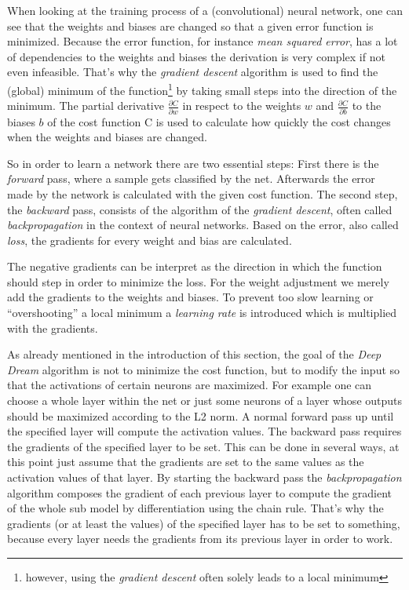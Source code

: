 When looking at the training process of a (convolutional) neural network, one can see that the weights and biases are changed so that a given error function is minimized.
Because the error function, for instance \emph{mean squared error}, has a lot of dependencies to the weights and biases the derivation is very complex if not even infeasible.
That's why the \emph{gradient descent} algorithm is used to find the (global) minimum of the function\footnote{however, using the \textit{gradient descent} often solely leads to a local minimum} by taking small steps into the direction of the minimum.
The partial derivative $\frac{\partial C}{\partial w}$ in respect to the weights $w$ and $\frac{\partial C}{\partial b}$ to the biases $b$ of the cost function C is used to calculate how quickly the cost changes when the weights and biases are changed.

So in order to learn a network there are two essential steps:
First there is the \emph{forward} pass, where a sample gets classified by the net.
Afterwards the error made by the network is calculated with the given cost function.
The second step, the \emph{backward} pass, consists of the algorithm of the \emph{gradient descent}, often called \emph{backpropagation} in the context of neural networks.
Based on the error, also called \emph{loss}, the gradients for every weight and bias are calculated.

The negative gradients can be interpret as the direction in which the function should step in order to minimize the loss.
For the weight adjustment we merely add the gradients to the weights and biases.
To prevent too slow learning or \enquote{overshooting} a local minimum a \emph{learning rate} is introduced which is multiplied with the gradients.

As already mentioned in the introduction of this section, the goal of the \emph{Deep Dream} algorithm is not to minimize the cost function, but to modify the input so that the activations of certain neurons are maximized.
For example one can choose a whole layer within the net or just some neurons of a layer whose outputs should be maximized according to the L2 norm.
A normal forward pass up until the specified layer will compute the activation values.
The backward pass requires the gradients of the specified layer to be set.
This can be done in several ways, at this point just assume that the gradients are set to the same values as the activation values of that layer.
By starting the backward pass the \textit{backpropagation} algorithm composes the gradient of each previous layer to compute the gradient of the whole sub model by differentiation using the chain rule.\cite{caffe-backward}
That's why the gradients (or at least the values) of the specified layer has to be set to something, because every layer needs the gradients from its previous layer in order to work.


